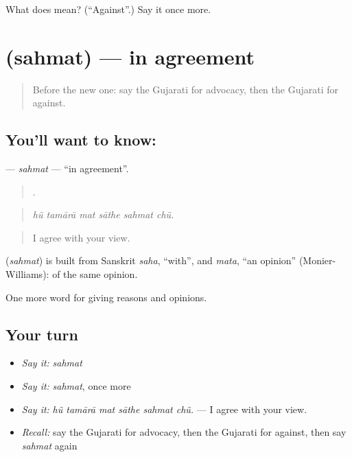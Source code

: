 \begin{tcolorbox}[breakable,colback=teal!4,colframe=teal!35!black,title={Before you move on}]
What does  mean? (\textquotedblleft{}Against\textquotedblright{}.) Say it once more.
\end{tcolorbox}
\section[\texorpdfstring{\gu{સહમત} (sahmat)}{સહમત (sahmat)}]{ (sahmat) — in agreement}

\label{lesson:GU-C343-sahmat}



\begin{quote}
Before the new one: say the Gujarati for advocacy, then the Gujarati for against.
\end{quote}

\subsection*{You'll want to know: }
\textbf{} — \emph{sahmat} — \textquotedblleft{}in agreement\textquotedblright{}.

\begin{quote}
     .
\end{quote}

\begin{quote}
\emph{hũ tamārā mat sāthe sahmat chũ.}
\end{quote}

\begin{quote}
I agree with your view.
\end{quote}

\begin{cousinweb}
\textbf{} (\emph{sahmat}) is built from Sanskrit \emph{saha}, \textquotedblleft{}with\textquotedblright{}, and \emph{mata}, \textquotedblleft{}an opinion\textquotedblright{} (Monier-Williams): of the same opinion.
\end{cousinweb}

\begin{grammarlens}[title={What you've built}]
One more word for giving reasons and opinions.
\end{grammarlens}

\subsection*{Your turn}
\begin{itemize}
\raggedright
  \item \emph{Say it:} \emph{sahmat}
  \item \emph{Say it:} \emph{sahmat}, once more
  \item \emph{Say it:} \emph{hũ tamārā mat sāthe sahmat chũ.} — I agree with your view.
  \item \emph{Recall:} say the Gujarati for advocacy, then the Gujarati for against, then say \emph{sahmat} again
\end{itemize}

